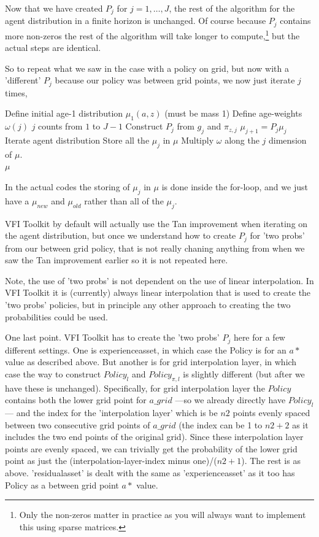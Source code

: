 Now that we have created $P_j$ for $j=1,\dots, J$, the rest of the algorithm for the agent distribution in a finite horizon is unchanged. Of course because $P_j$ contains more non-zeros the rest of the algorithm will take longer to compute,\footnote{Only the non-zeros matter in practice as you will always want to implement this using sparse matrices.} but the actual steps are identical.

So to repeat what we saw in the case with a policy on grid, but now with a 'different' $P_j$ because our policy was between grid points, we now just iterate $j$ times,
\begin{algorithmic}
 \State Define initial age-1 distribution $\mu_1(a,z)$ (must be mass 1)
 \State Define age-weights $\omega(j)$
 \For $j$ counts from $1$ to $J-1$
  \State Construct $P_j$ from $g_j$ and $\pi_{z,j}$
  \State $\mu_{j+1}=P_j \mu_j$ \Comment Iterate agent distribution
 \EndFor
 \State Store all the $\mu_j$ in $\mu$
  \State Multiply $\omega$ along the $j$ dimension of $\mu$.
 \\ \Return $\mu$
 \end{algorithmic}
In the actual codes the storing of $\mu_j$ in $\mu$ is done inside the for-loop, and we just have a $\mu_{new}$ and $\mu_{old}$ rather than all of the $\mu_j$.

VFI Toolkit by default will actually use the Tan improvement when iterating on the agent distribution, but once we understand how to create $P_j$ for 'two probs' from our between grid policy, that is not really chaning anything from when we saw the Tan improvement earlier so it is not repeated here.

Note, the use of 'two probs' is not dependent on the use of linear interpolation. In VFI Toolkit it is (currently) always linear interpolation that is used to create the 'two probs' policies, but in principle any other approach to creating the two probabilities could be used.

One last point. VFI Toolkit has to create the 'two probs' $P_j$ here for a few different settings. One is experienceasset, in which case the Policy is for an $a*$ value as described above. But another is for grid interpolation layer, in which case the way to construct $Policy_l$ and $Policy_{\pi,l}$ is slightly different (but after we have these is unchanged). Specifically, for grid interpolation layer the $Policy$ contains both the lower grid point for $a\_{}grid$ ---so we already directly have $Policy_l$--- and the index for the 'interpolation layer' which is be $n2$ points evenly spaced between two consecutive grid points of $a\_{}grid$ (the index can be 1 to $n2+2$ as it includes the two end points of the original grid). Since these interpolation layer points are evenly spaced, we can trivially get the probability of the lower grid point as just the (interpolation-layer-index minus one)/($n2+1$). The rest is as above. 'residualasset' is dealt with the same as 'experienceasset' as it too has Policy as a between grid point $a*$ value.

